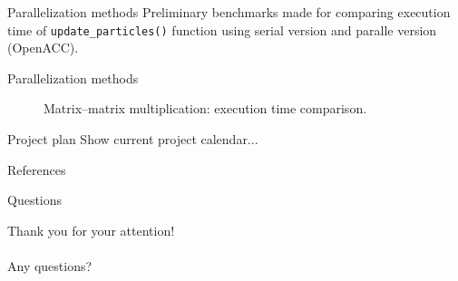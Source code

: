 \documentclass[aspectratio=169]{beamer}
\begin{document}
\begin{frame}[fragile]{Parallelization methods}
	Preliminary benchmarks made for comparing execution time of \texttt{update\_particles()} function using serial version and paralle version (OpenACC).
\end{frame}

\begin{frame}[fragile]{Parallelization methods}
	\begin{figure}[H]
		\centering
		
		\caption{Matrix--matrix multiplication: execution time comparison.}
	\end{figure}
\end{frame}

\begin{frame}[fragile]{Project plan}
	Show current project calendar...
\end{frame}

\begin{frame}[fragile]{References}
	\printbibliography
\end{frame}

\begin{frame}[fragile]{Questions}
	\begin{center}
		Thank you for your attention!\\
		\\
		Any questions?
	\end{center}
\end{frame}
\end{document}
